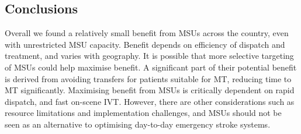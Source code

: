 \subsection{Conclusions}

Overall we found a relatively small benefit from MSUs across the country, even with unrestricted MSU capacity. Benefit depends on efficiency of dispatch and treatment, and varies with geography. It is possible that more selective targeting of MSUs could help maximise benefit. A significant part of their potential benefit is derived from avoiding transfers for patients suitable for MT, reducing time to MT significantly. Maximising benefit from MSUs is critically dependent on rapid dispatch, and fast on-scene IVT. However, there are other considerations such as resource limitations and implementation challenges, and MSUs should not be seen as an alternative to optimising day-to-day emergency stroke systems.
